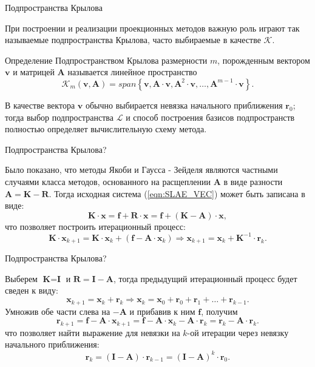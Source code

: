 \documentclass[10pt,xcolor=pst,aspectratio=169]{beamer}
\begin{document}
\begin{frame}{Подпространства Крылова}

	\transdissolve[duration=0.2]
	\justifying
	При построении и реализации проекционных методов важную роль играют так называемые подпространства Крылова, часто выбираемые в качестве $\mathcal{K}$.
	\begin{block}{Определение}
		\justifying
		Подпространством Крылова размерности $m$, порожденным вектором $\textbf{v}$ и матрицей $\textbf{A}$ называется линейное пространство
		\[
			\mathcal{K}_{m} (\textbf{v} , \textbf{A}) = span \left\lbrace \textbf{v} , \textbf{A} \cdot \textbf{v} , \textbf{A}^{2} \cdot \textbf{v} , \ldots , \textbf{A}^{m - 1} \cdot \textbf{v} \right\rbrace .
		\]
	\end{block}
	В качестве вектора $\textbf{v}$ обычно выбирается невязка начального приближения $\textbf{r}_{0}$; тогда выбор подпространства $\mathcal{L}$ и способ построения базисов подпространств полностью определяет вычислительную схему метода.

\end{frame}

\begin{frame}{Подпространства Крылова?}

	\transdissolve[duration=0.2]
	\justifying
	\large
	Было показано, что методы Якоби и Гаусса - Зейделя являются частными случаями класса методов, основанного на расщеплении $\textbf{A}$ в виде разности $\textbf{A} = \textbf{K} - \textbf{R}$. Тогда исходная система (\ref{eqn:SLAE_VEC}) может быть записана в виде:
	\[
		\textbf{K} \cdot \textbf{x} = \textbf{f} + \textbf{R} \cdot \textbf{x} = \textbf{f} + (\textbf{K} - \textbf{A}) \cdot \textbf{x} ,
	\]
	что позволяет построить итерационный процесс:
	\[
		\textbf{K} \cdot \textbf{x}_{k+1} = \textbf{K} \cdot \textbf{x}_{k} + (\textbf{f} - \textbf{A} \cdot \textbf{x}_{k}) \Rightarrow \textbf{x}_{k+1} = \textbf{x}_{k} + \textbf{K}^{-1} \cdot \textbf{r}_{k}.
	\]

\end{frame}

\begin{frame}{Подпространства Крылова?}

	\transdissolve[duration=0.2]
	\justifying
	\large
	Выберем $\textbf{K} = \textbf{I}$ и $\textbf{R} = \textbf{I} - \textbf{A}$, тогда предыдущий итерационный процесс будет сведен к виду:
	\[
		\textbf{x}_{k+1} = \textbf{x}_{k} + \textbf{r}_{k} \Rightarrow \textbf{x}_{k} = \textbf{x}_{0} + \textbf{r}_{0} + \textbf{r}_{1} + \ldots + \textbf{r}_{k - 1}.
	\]
	Умножив обе части слева на $- \textbf{A}$ и прибавив к ним $\textbf{f}$, получим
	\[
		\textbf{r}_{k + 1} = \textbf{f} - \textbf{A} \cdot \textbf{x}_{k+1} = \textbf{f} - \textbf{A} \cdot \textbf{x}_{k} - \textbf{A} \cdot \textbf{r}_{k} = \textbf{r}_{k} - \textbf{A} \cdot \textbf{r}_{k}.
	\]
	что позволяет найти выражение для невязки на $k$-ой итерации через невязку начального приближения:
	\[
		\textbf{r}_{k} = (\textbf{I} - \textbf{A}) \cdot \textbf{r}_{k - 1} = (\textbf{I} - \textbf{A})^{k} \cdot \textbf{r}_{0}.
	\]

\end{frame}
\end{document}
